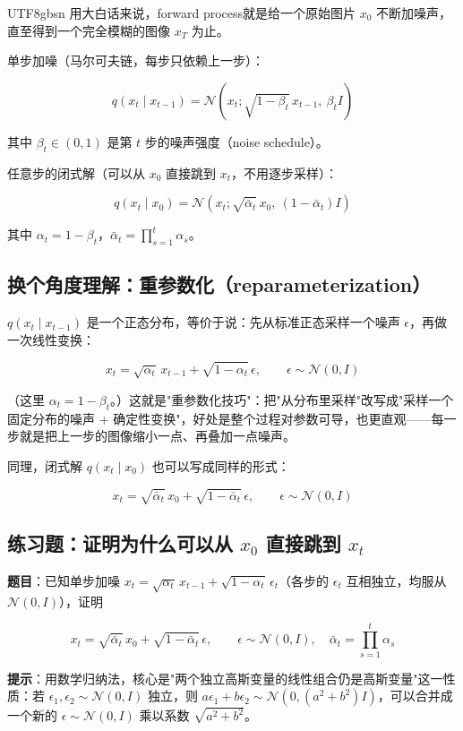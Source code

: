 \documentclass{article}
\begin{document}
\begin{CJK}{UTF8}{gbsn}
用大白话来说，forward process就是给一个原始图片 $x_0$ 不断加噪声，直至得到一个完全模糊的图像 $x_T$ 为止。

单步加噪（马尔可夫链，每步只依赖上一步）：

\[
q(x_t \mid x_{t-1}) = \mathcal{N}\left(x_t; \sqrt{1-\beta_t}\, x_{t-1},\ \beta_t I\right)
\]

其中 $\beta_t \in (0,1)$ 是第 $t$ 步的噪声强度（noise schedule）。

任意步的闭式解（可以从 $x_0$ 直接跳到 $x_t$，不用逐步采样）：

\[
q(x_t \mid x_0) = \mathcal{N}\left(x_t; \sqrt{\bar\alpha_t}\, x_0,\ (1-\bar\alpha_t) I\right)
\]

其中 $\alpha_t = 1-\beta_t$，$\bar\alpha_t = \prod_{s=1}^{t} \alpha_s$。

\subsection{换个角度理解：重参数化（reparameterization）}

$q(x_t \mid x_{t-1})$ 是一个正态分布，等价于说：先从标准正态采样一个噪声 $\epsilon$，再做一次线性变换：

\[
x_t = \sqrt{\alpha_t}\, x_{t-1} + \sqrt{1-\alpha_t}\, \epsilon, \qquad \epsilon \sim \mathcal{N}(0, I)
\]

（这里 $\alpha_t = 1-\beta_t$。）这就是"重参数化技巧"：把"从分布里采样"改写成"采样一个固定分布的噪声 + 确定性变换"，好处是整个过程对参数可导，也更直观——每一步就是把上一步的图像缩小一点、再叠加一点噪声。

同理，闭式解 $q(x_t \mid x_0)$ 也可以写成同样的形式：

\[
x_t = \sqrt{\bar\alpha_t}\, x_0 + \sqrt{1-\bar\alpha_t}\, \epsilon, \qquad \epsilon \sim \mathcal{N}(0, I)
\]

\subsection{练习题：证明为什么可以从 $x_0$ 直接跳到 $x_t$}

\textbf{题目}：已知单步加噪 $x_t = \sqrt{\alpha_t}\, x_{t-1} + \sqrt{1-\alpha_t}\, \epsilon_t$（各步的 $\epsilon_t$ 互相独立，均服从 $\mathcal{N}(0,I)$），证明

\[
x_t = \sqrt{\bar\alpha_t}\, x_0 + \sqrt{1-\bar\alpha_t}\, \epsilon, \qquad \epsilon \sim \mathcal{N}(0, I),\quad \bar\alpha_t = \prod_{s=1}^t \alpha_s
\]

\textbf{提示}：用数学归纳法，核心是"两个独立高斯变量的线性组合仍是高斯变量"这一性质：若 $\epsilon_1, \epsilon_2 \sim \mathcal{N}(0,I)$ 独立，则 $a\epsilon_1 + b\epsilon_2 \sim \mathcal{N}(0, (a^2+b^2)I)$，可以合并成一个新的 $\epsilon \sim \mathcal{N}(0,I)$ 乘以系数 $\sqrt{a^2+b^2}$。


\end{CJK}
\end{document}
